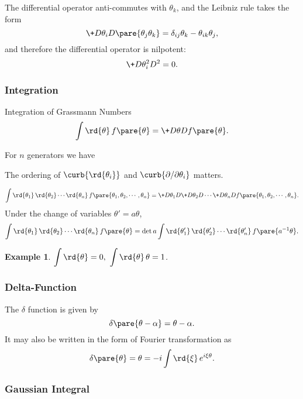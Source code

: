 \documentclass[hidelinks]{article}
\newtheorem{example}{Example}
\begin{document}
The differential operator anti-commutes with $\theta_k$, and the Leibniz rule takes the form
\[ \+D{\theta_i}D{}\pare{\theta_j \theta_k} = \delta_{ij}\theta_k - \theta_{ik}\theta_j, \]
and therefore the differential operator is nilpotent:
\[ \+D{\theta_i^2}D{^2} = 0. \]


\subsubsection{Integration} %
\label{ssub:integration}

\begin{termdef}{Integration of Grassmann Numbers}
    \[ \int \rd{\theta}\, f\pare{\theta} = \+D\theta D{f\pare{\theta}}. \]
\end{termdef}
For $n$ generators we have \begin{marginwarns}
    The ordering of $\curb{\rd{\theta_i}}$ and $\curb{\partial/\partial \theta_i}$ matters.
\end{marginwarns}
\[ \int \rd{\theta_1}\,\rd{\theta_2}\cdots \rd{\theta_n}\, f\pare{\theta_1,\theta_2,\cdots,\theta_n} = \+D{\theta_1}D{} \+D{\theta_2}D{} \cdots \+D{\theta_n}D{} f\pare{\theta_1,\theta_2,\cdots,\theta_n}. \]
Under the change of variables $\theta' = a\theta$,
\[ \int \rd{\theta_1}\,\rd{\theta_2}\cdots \rd{\theta_n}\, f\pare{\theta} = \det a \int \rd{\theta_1'}\,\rd{\theta_2'}\cdots \rd{\theta_n'}\, f\pare{a^{-1}\theta}. \]
\begin{sample}
    \begin{example}
        $\displaystyle \int \rd{\theta} = 0,\ \int \rd{\theta}\,\theta = 1$.
    \end{example}
\end{sample}


\subsubsection{Delta-Function} %
\label{ssub:delta_function}

The $\delta$ function is given by
\[ \delta\pare{\theta-\alpha} = \theta-\alpha. \]
It may also be written in the form of Fourier transformation as
\[ \delta\pare{\theta} = \theta = -i\int \rd{\xi}\,e^{i\xi\theta}. \]


\subsubsection{Gaussian Integral} %
\label{ssub:gaussian_integral}
\end{document}
